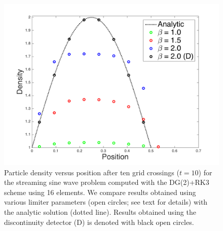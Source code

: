 \documentclass[10pt,preprint]{aastex}
\begin{document}
\begin{figure}
  \begin{center}
    \includegraphics[scale=0.78]{./Figures/StreamingSineWave1D}
  \end{center}
  \caption{Particle density versus position after ten grid crossings ($t=10$) for the streaming sine wave problem computed with the DG(2)+RK3 scheme using 16 elements.  
  We compare results obtained using various limiter parameters (open circles; see text for details) with the analytic solution (dotted line).  
  Results obtained using the discontinuity detector (D) is denoted with black open circles.}
  \label{fig:streamingSineWave}
\end{figure}
\end{document}
